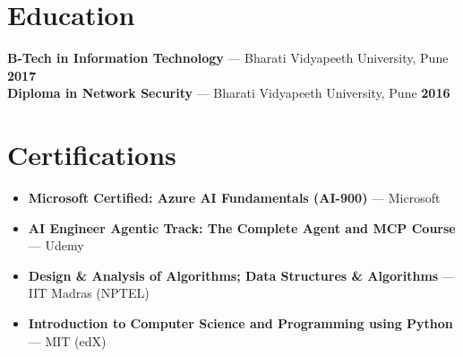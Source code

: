 \documentclass[10pt,a4paper]{article}
\begin{document}
\section{Education}
\small
\noindent \textbf{B-Tech in Information Technology} --- Bharati Vidyapeeth University, Pune \hfill \textbf{2017} \\
\noindent \textbf{Diploma in Network Security} --- Bharati Vidyapeeth University, Pune \hfill \textbf{2016}
\normalsize

\section{Certifications}
\small
\begin{itemize}
    \item \textbf{Microsoft Certified: Azure AI Fundamentals (AI-900)} --- Microsoft
    \item \textbf{AI Engineer Agentic Track: The Complete Agent and MCP Course} --- Udemy
    \item \textbf{Design \& Analysis of Algorithms; Data Structures \& Algorithms} --- IIT Madras (NPTEL)
    \item \textbf{Introduction to Computer Science and Programming using Python} --- MIT (edX)
\end{itemize}
\normalsize
\end{document}
